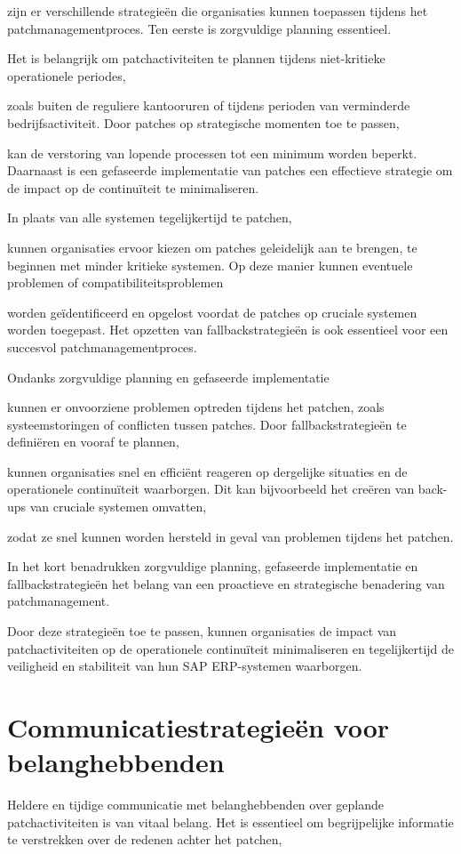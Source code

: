 zijn er verschillende strategieën die organisaties kunnen toepassen tijdens het patchmanagementproces. Ten eerste is zorgvuldige planning essentieel.

Het is belangrijk om patchactiviteiten te plannen tijdens niet-kritieke operationele periodes, 

zoals buiten de reguliere kantooruren of tijdens perioden van verminderde bedrijfsactiviteit. Door patches op strategische momenten toe te passen,

kan de verstoring van lopende processen tot een minimum worden beperkt. Daarnaast is een gefaseerde implementatie van patches een effectieve strategie om de impact op de continuïteit te minimaliseren. 

In plaats van alle systemen tegelijkertijd te patchen, 

kunnen organisaties ervoor kiezen om patches geleidelijk aan te brengen, te beginnen met minder kritieke systemen. Op deze manier kunnen eventuele problemen of compatibiliteitsproblemen

worden geïdentificeerd en opgelost voordat de patches op cruciale systemen worden toegepast. Het opzetten van fallbackstrategieën is ook essentieel voor een succesvol patchmanagementproces.

Ondanks zorgvuldige planning en gefaseerde implementatie 

kunnen er onvoorziene problemen optreden tijdens het patchen, zoals systeemstoringen of conflicten tussen patches. Door fallbackstrategieën te definiëren en vooraf te plannen,

kunnen organisaties snel en efficiënt reageren op dergelijke situaties en de operationele continuïteit waarborgen. Dit kan bijvoorbeeld het creëren van back-ups van cruciale systemen omvatten, 

zodat ze snel kunnen worden hersteld in geval van problemen tijdens het patchen.

In het kort benadrukken zorgvuldige planning, gefaseerde implementatie en fallbackstrategieën het belang van een proactieve en strategische benadering van patchmanagement. 

Door deze strategieën toe te passen, kunnen organisaties de impact van patchactiviteiten op de operationele continuïteit minimaliseren en tegelijkertijd de veiligheid en stabiliteit van hun SAP ERP-systemen waarborgen.

\section{Communicatiestrategieën voor belanghebbenden}
Heldere en tijdige communicatie met belanghebbenden over geplande patchactiviteiten is van vitaal belang. Het is essentieel om begrijpelijke informatie te verstrekken over de redenen achter het patchen,

